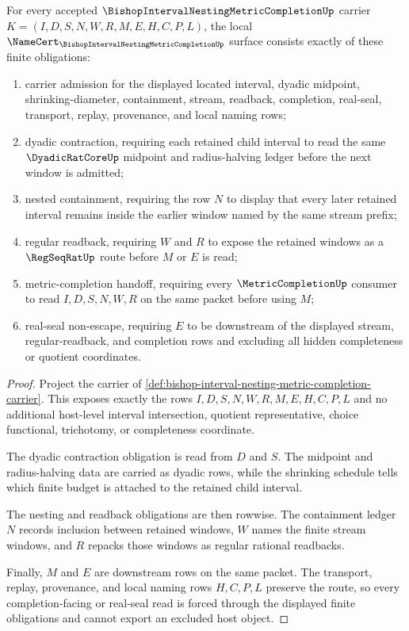 \begin{theorem}
\label{thm:bishop-interval-nesting-metric-completion-namecert-obligations}
For every accepted $\BishopIntervalNestingMetricCompletionUp$ carrier $K=(I,D,S,N,W,R,M,E,H,C,P,L)$, the local $\NameCert_{\BishopIntervalNestingMetricCompletionUp}$ surface consists exactly of these finite obligations:
\begin{enumerate}
\item carrier admission for the displayed located interval, dyadic midpoint, shrinking-diameter, containment, stream, readback, completion, real-seal, transport, replay, provenance, and local naming rows;
\item dyadic contraction, requiring each retained child interval to read the same $\DyadicRatCoreUp$ midpoint and radius-halving ledger before the next window is admitted;
\item nested containment, requiring the row $N$ to display that every later retained interval remains inside the earlier window named by the same stream prefix;
\item regular readback, requiring $W$ and $R$ to expose the retained windows as a $\RegSeqRatUp$ route before $M$ or $E$ is read;
\item metric-completion handoff, requiring every $\MetricCompletionUp$ consumer to read $I,D,S,N,W,R$ on the same packet before using $M$;
\item real-seal non-escape, requiring $E$ to be downstream of the displayed stream, regular-readback, and completion rows and excluding all hidden completeness or quotient coordinates.
\end{enumerate}
\end{theorem}
\begin{proof}
Project the carrier of \autoref{def:bishop-interval-nesting-metric-completion-carrier}. This exposes exactly the rows $I,D,S,N,W,R,M,E,H,C,P,L$ and no additional host-level interval intersection, quotient representative, choice functional, trichotomy, or completeness coordinate.

The dyadic contraction obligation is read from $D$ and $S$. The midpoint and radius-halving data are carried as dyadic rows, while the shrinking schedule tells which finite budget is attached to the retained child interval.

The nesting and readback obligations are then rowwise. The containment ledger $N$ records inclusion between retained windows, $W$ names the finite stream windows, and $R$ repacks those windows as regular rational readbacks.

Finally, $M$ and $E$ are downstream rows on the same packet. The transport, replay, provenance, and local naming rows $H,C,P,L$ preserve the route, so every completion-facing or real-seal read is forced through the displayed finite obligations and cannot export an excluded host object.
\end{proof}

